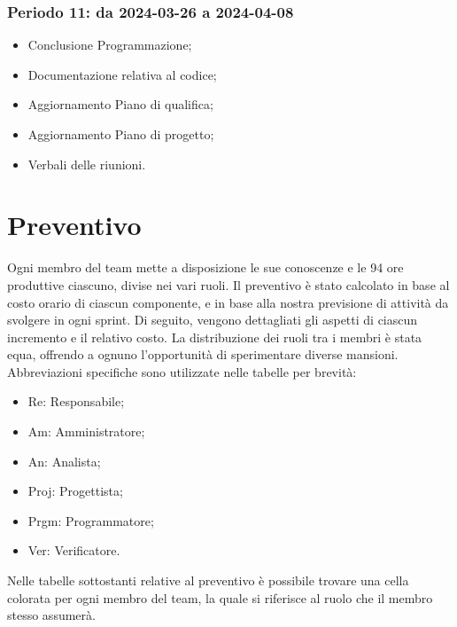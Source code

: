 \documentclass[10pt, a4paper]{article}
\begin{document}
{{{{{{{{\subsubsection{Periodo 11: da 2024-03-26 a 2024-04-08}
%
\begin{itemize}
    \item Conclusione Programmazione;
    \item Documentazione relativa al codice;
    \item Aggiornamento Piano di qualifica;
    \item Aggiornamento Piano di progetto;
    \item Verbali delle riunioni.
\end{itemize}


\newpage

\section{Preventivo}
Ogni membro del team mette a disposizione le sue conoscenze e le 94 ore produttive ciascuno, divise nei vari ruoli. Il preventivo è stato calcolato in base al costo orario di ciascun componente, e in base alla nostra previsione di attività da svolgere in ogni sprint. Di seguito, vengono dettagliati gli aspetti di ciascun incremento e il relativo costo. La distribuzione dei ruoli tra i membri è stata equa, offrendo a ognuno l'opportunità di sperimentare diverse mansioni. Abbreviazioni specifiche sono utilizzate nelle tabelle per brevità:
\begin{itemize}
    \item Re: Responsabile;
    \item Am: Amministratore;
    \item An: Analista;
    \item Proj: Progettista;
    \item Prgm: Programmatore;
    \item Ver: Verificatore.
\end{itemize}
Nelle tabelle sottostanti relative al preventivo è possibile trovare una cella colorata per ogni membro del team, la quale si riferisce al ruolo che il membro stesso assumerà.
}}}}}}}}
\end{document}
